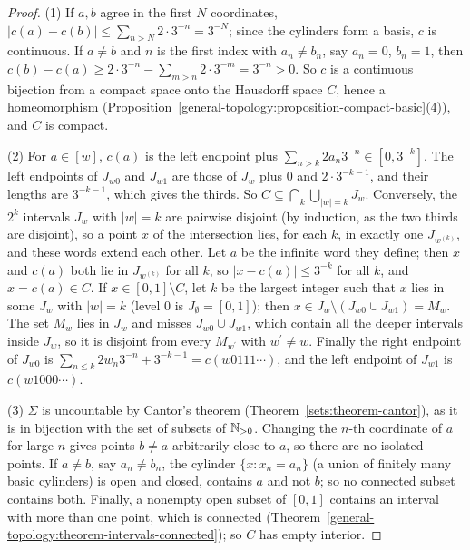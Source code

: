 \begin{proof}
(1) If $a, b$ agree in the first $N$ coordinates, $|c(a) - c(b)| \leq \sum_{n > N}2 \cdot 3^{-n} = 3^{-N}$; since the cylinders form a basis, $c$ is continuous. If $a \neq b$ and $n$ is the first index with
$a_n \neq b_n$, say $a_n = 0$, $b_n = 1$, then $c(b) - c(a) \geq 2 \cdot 3^{-n} - \sum_{m > n}2 \cdot 3^{-m} = 3^{-n} > 0$. So $c$ is a continuous bijection from a compact space onto the Hausdorff space $C$, hence
a homeomorphism (Proposition~\ref{general-topology:proposition-compact-basic}(4)), and $C$ is compact.

(2) For $a \in [w]$, $c(a)$ is the left endpoint plus $\sum_{n > k}2a_n3^{-n} \in [0, 3^{-k}]$. The left endpoints of $J_{w0}$ and $J_{w1}$ are those of $J_w$ plus $0$ and $2 \cdot 3^{-k-1}$, and their lengths are
$3^{-k-1}$, which gives the thirds. So $C \subseteq \bigcap_k\bigcup_{|w| = k}J_w$. Conversely, the $2^k$ intervals $J_w$ with $|w| = k$ are pairwise disjoint (by induction, as the two thirds are disjoint), so a
point $x$ of the intersection lies, for each $k$, in exactly one $J_{w^{(k)}}$, and these words extend each other. Let $a$ be the infinite word they define; then $x$ and $c(a)$ both lie in $J_{w^{(k)}}$ for all $k$,
so $|x - c(a)| \leq 3^{-k}$ for all $k$, and $x = c(a) \in C$. If $x \in [0, 1] \setminus C$, let $k$ be the largest integer such that $x$ lies in some $J_w$ with $|w| = k$ (level $0$ is
$J_\emptyset = [0, 1]$); then $x \in J_w \setminus (J_{w0} \cup J_{w1}) = M_w$. The set $M_w$ lies in $J_w$ and misses $J_{w0} \cup J_{w1}$, which contain all the deeper intervals inside $J_w$, so it is
disjoint from every $M_{w^{\prime}}$ with $w^{\prime} \neq w$. Finally the right endpoint of $J_{w0}$ is $\sum_{n \leq k}2w_n3^{-n} + 3^{-k-1} = c(w0111\cdots)$, and the left endpoint of $J_{w1}$ is $c(w1000\cdots)$.

(3) $\Sigma$ is uncountable by Cantor's theorem (Theorem~\ref{sets:theorem-cantor}), as it is in bijection with the set of subsets of $\mathbb{N}_{>0}$. Changing the $n$-th coordinate of $a$ for large $n$ gives points
$b \neq a$ arbitrarily close to $a$, so there are no isolated points. If $a \neq b$, say $a_n \neq b_n$, the cylinder $\{x : x_n = a_n\}$ (a union of finitely many basic cylinders) is open and closed, contains $a$
and not $b$; so no connected subset contains both. Finally, a nonempty open subset of $[0, 1]$ contains an interval with more than one point, which is connected
(Theorem~\ref{general-topology:theorem-intervals-connected}); so $C$ has empty interior.
\end{proof}

